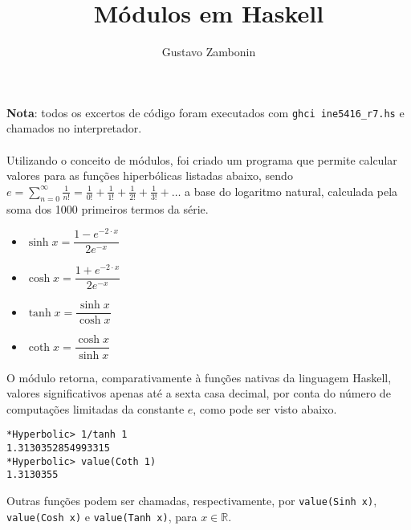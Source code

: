 \documentclass{../sftex/sftex}
\title{Módulos em Haskell}
\author{Gustavo Zambonin}
\begin{document}
\maketitle

\textbf{Nota}: todos os excertos de código foram executados com
\verb!ghci ine5416_r7.hs! e chamados no interpretador. \\ \\
Utilizando o conceito de módulos, foi criado um programa que
permite calcular valores para as funções hiperbólicas listadas abaixo,
sendo $e = \sum\limits_{n=0}^\infty \frac{1}{n!} = \frac{1}{0!} +
\frac{1}{1!} + \frac{1}{2!} + \frac{1}{3!} + \dots$ a base do logaritmo
natural, calculada pela soma dos 1000 primeiros termos da série.
\begin{itemize}
    \item $\sinh x = \dfrac{1 - e^{-2 \cdot x}}{2e^{-x}}$
    \item $\cosh x = \dfrac{1 + e^{-2 \cdot x}}{2e^{-x}}$
    \item $\tanh x = \dfrac{\sinh x}{\cosh x}$
    \item $\coth x = \dfrac{\cosh x}{\sinh x}$
\end{itemize}
O módulo retorna, comparativamente à funções nativas da linguagem Haskell,
valores significativos apenas até a sexta casa decimal, por conta do
número de computações limitadas da constante $e$, como pode ser
visto abaixo.

\begin{verbatim}
*Hyperbolic> 1/tanh 1
1.3130352854993315
*Hyperbolic> value(Coth 1)
1.3130355
\end{verbatim}
Outras funções podem ser chamadas, respectivamente, por
\verb!value(Sinh x)!, \verb!value(Cosh x)! e \verb!value(Tanh x)!,
para $x \in \mathbb{R}$.
\end{document}
